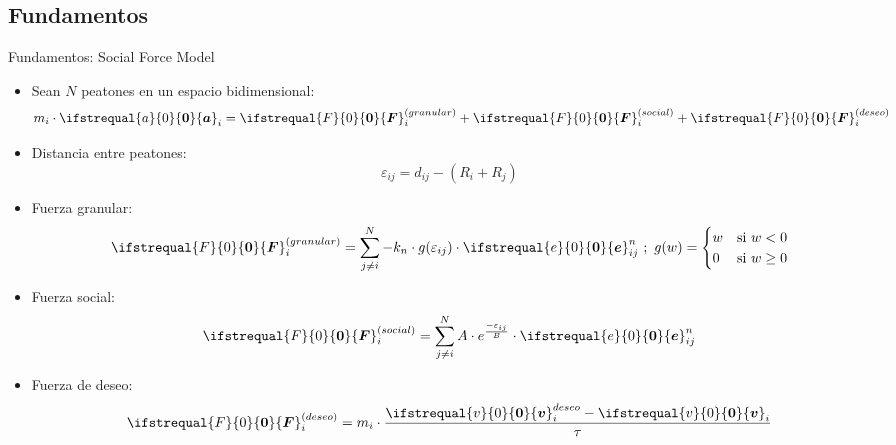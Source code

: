 \documentclass{beamer}
\renewcommand\vec[1]{\ifstrequal{#1}{0}{\ensuremath{\mathbf{0}}}{\ensuremath{\boldsymbol{#1}}}}
\begin{document}
        \subsection{Fundamentos}

            \begin{frame}{Fundamentos: Social Force Model}
                \begin{itemize}
                    \item Sean $N$ peatones en un espacio bidimensional:
                        \begin{equation*}
                            m_i \cdot \vec{a}_i = \vec{F}_{i}^{(granular)} + \vec{F}_{i}^{(social)} + \vec{F}_{i}^{(deseo)}
                        \end{equation*}
                    \item Distancia entre peatones:
                        \begin{equation*}
                            \varepsilon_{ij} = d_{ij} - (R_i + R_j)
                        \end{equation*}
                    \item Fuerza granular:
                        \begin{equation*}
                            \vec{F}_{i}^{(granular)} = \sum_{j \neq i}^{N} -k_n \cdot g(\varepsilon_{ij}) \cdot \vec{e}_{ij}^{n}\ ;\ g(w) = \begin{cases} w & \text{si } w < 0 \\ 0 & \text{si } w \geq 0 \end{cases}
                        \end{equation*}
                \end{itemize}
                \begin{minipage}[t]{0.49\textwidth}
                    \begin{itemize}
                        \item Fuerza social:
                        \begin{equation*}
                            \vec{F}_{i}^{(social)} = \sum_{j \neq i}^{N} A \cdot e^{\frac{-\varepsilon_{ij}}{B}} \cdot \vec{e}_{ij}^{n}
                        \end{equation*}
                    \end{itemize}
                \end{minipage}
                \hfill
                \begin{minipage}[t]{0.49\textwidth}
                    \begin{itemize}
                        \item Fuerza de deseo:
                        \begin{equation*}
                            \vec{F}_{i}^{(deseo)} = m_i \cdot \frac{\vec{v}_i^{deseo} - \vec{v}_i}{\tau}
                        \end{equation*}
                    \end{itemize}
                \end{minipage}
            \end{frame}
\end{document}
